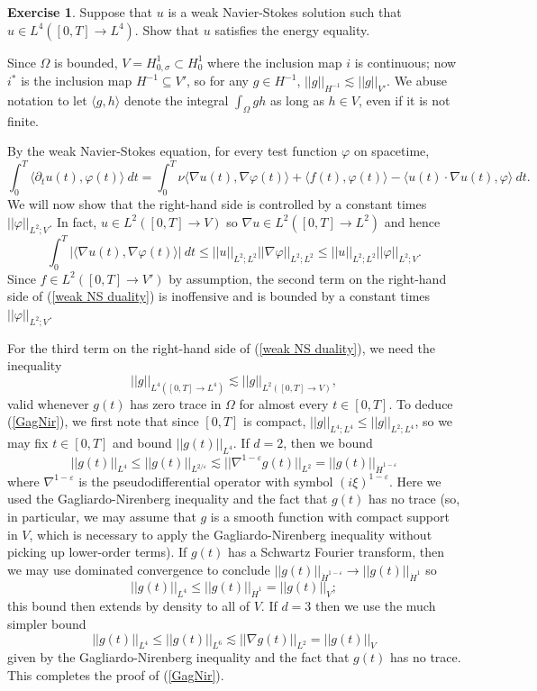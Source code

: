 \documentclass[10pt]{article}
\theoremstyle{definition}
\newtheorem{exer}{Exercise}
\begin{document}
\begin{exer}
Suppose that $u$ is a weak Navier-Stokes solution such that $u \in L^4([0, T] \to L^4)$.
Show that $u$ satisfies the energy equality.
\end{exer}

Since $\Omega$ is bounded, $V = H^1_{0, \sigma} \subset H^1_0$ where the inclusion map $i$ is continuous; now $i^*$ is the inclusion map $H^{-1} \subseteq V'$, so for any $g \in H^{-1}$, $||g||_{H^{-1}} \lesssim ||g||_{V'}$.
We abuse notation to let $\langle g, h\rangle$ denote the integral $\int_\Omega gh$ as long as $h \in V$, even if it is not finite.

By the weak Navier-Stokes equation, for every test function $\varphi$ on spacetime,
\begin{equation}
\label{weak NS duality}
\int_0^T \langle \partial_t u(t), \varphi(t)\rangle ~dt = \int_0^T \nu \langle \nabla u(t), \nabla \varphi(t)\rangle + \langle f(t), \varphi(t)\rangle - \langle u(t) \cdot \nabla u(t), \varphi\rangle ~dt.
\end{equation}
We will now show that the right-hand side is controlled by a constant times $||\varphi||_{L^2;V}$.
In fact, $u \in L^2([0, T] \to V)$ so $\nabla u \in L^2([0, T] \to L^2)$
and hence
$$\int_0^T |\langle \nabla u(t), \nabla \varphi(t)\rangle| ~dt \leq ||u||_{L^2;L^2}||\nabla \varphi||_{L^2;L^2} \leq ||u||_{L^2;L^2} ||\varphi||_{L^2;V}.$$
Since $f \in L^2([0, T] \to V')$ by assumption, the second term on the right-hand side of (\ref{weak NS duality}) is inoffensive and is bounded by a constant times $||\varphi||_{L^2;V}$.

For the third term on the right-hand side of (\ref{weak NS duality}), we need the inequality
\begin{equation}
\label{GagNir}
||g||_{L^4([0, T] \to L^4)} \lesssim ||g||_{L^2([0, T] \to V)},
\end{equation}
valid whenever $g(t)$ has zero trace in $\Omega$ for almost every $t \in [0, T]$.
To deduce (\ref{GagNir}), we first note that since $[0, T]$ is compact, $||g||_{L^4;L^4} \leq ||g||_{L^2;L^4}$, so we may fix $t \in [0, T]$ and bound $||g(t)||_{L^4}$.
If $d = 2$, then we bound
$$||g(t)||_{L^4} \leq ||g(t)||_{L^{2/\varepsilon}} \lesssim ||\nabla^{1 - \varepsilon} g(t)||_{L^2} = ||g(t)||_{\dot H^{1 - \varepsilon}}$$
where $\nabla^{1-\varepsilon}$ is the pseudodifferential operator with symbol $(i\xi)^{1 - \varepsilon}$.
Here we used the Gagliardo-Nirenberg inequality and the fact that $g(t)$ has no trace (so, in particular, we may assume that $g$ is a smooth function with compact support in $V$, which is necessary to apply the Gagliardo-Nirenberg inequality without picking up lower-order terms).
If $g(t)$ has a Schwartz Fourier transform, then we may use dominated convergence to conclude $||g(t)||_{\dot H^{1 - \varepsilon}} \to ||g(t)||_{\dot H^1}$ so
$$||g(t)||_{L^4} \leq ||g(t)||_{\dot H^1} = ||g(t)||_V;$$
this bound then extends by density to all of $V$.
If $d = 3$ then we use the much simpler bound
$$||g(t)||_{L^4} \leq ||g(t)||_{L^6} \lesssim ||\nabla g(t)||_{L^2} = ||g(t)||_V$$
given by the Gagliardo-Nirenberg inequality and the fact that $g(t)$ has no trace.
This completes the proof of (\ref{GagNir}).
\end{document}
